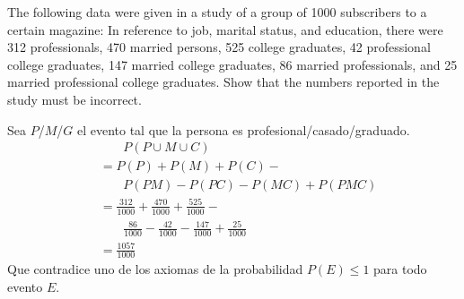 \item  The following data were given in a study of a group of 1000 subscribers to a certain magazine: In reference to job, marital status, and education, there were 312 professionals, 470 married persons, 525 college graduates, 42 professional college graduates, 147 married college graduates, 86 married professionals, and 25 married professional college graduates. Show that the numbers reported in the study must be incorrect.

Sea $P$/$M$/$G$ el evento tal que la persona es profesional/casado/graduado.
\begin{align*}
    &\phantom{\;=\;} P(P\cup M\cup C)\\
    &= P(P) + P(M) + P(C) - {} \\
    &\phantom{\;=\;} P(PM) - P(PC) - P(MC) + P(PMC)\\
    &= \tfrac{312}{1000} + \tfrac{470}{1000} + \tfrac{525}{1000} - {}\\
    &\phantom{\;=\;} \tfrac{86}{1000} - \tfrac{42}{1000} - \tfrac{147}{1000} + \tfrac{25}{1000}\\
    &= \tfrac{1057}{1000}
\end{align*}
Que contradice uno de los axiomas de la probabilidad $P(E) \le 1$ para todo evento $E$.